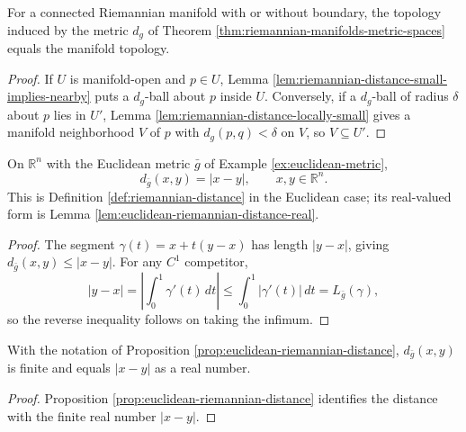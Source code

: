 \begin{theorem}
\label{thm:riemannian-distance-topology}





For a connected Riemannian manifold with or without boundary, the topology induced by the metric $d_g$ of Theorem \ref{thm:riemannian-manifolds-metric-spaces} equals the manifold topology.
\end{theorem}
\begin{proof}

\sketch If $U$ is manifold-open and $p\in U$, Lemma \ref{lem:riemannian-distance-small-implies-nearby} puts a $d_g$-ball about $p$ inside $U$. Conversely, if a $d_g$-ball of radius $\delta$ about $p$ lies in $U'$, Lemma \ref{lem:riemannian-distance-locally-small} gives a manifold neighborhood $V$ of $p$ with $d_g(p,q)<\delta$ on $V$, so $V\subseteq U'$.
\end{proof}

\begin{proposition}
\label{prop:euclidean-riemannian-distance}





On $\mathbb R^n$ with the Euclidean metric $\bar g$ of Example \ref{ex:euclidean-metric},
\[
d_{\bar g}(x,y)=|x-y|,
\qquad x,y\in\mathbb R^n.
\]
This is Definition \ref{def:riemannian-distance} in the Euclidean case; its real-valued form is Lemma \ref{lem:euclidean-riemannian-distance-real}.
\end{proposition}
\begin{proof}

\sketch The segment $\gamma(t)=x+t(y-x)$ has length $|y-x|$, giving $d_{\bar g}(x,y)\le|x-y|$. For any $C^1$ competitor,
\[
|y-x|=\left|\int_0^1\gamma'(t)\,dt\right|\le\int_0^1|\gamma'(t)|\,dt=L_{\bar g}(\gamma),
\]
so the reverse inequality follows on taking the infimum.
\end{proof}

\begin{lemma}
\label{lem:euclidean-riemannian-distance-real}





With the notation of Proposition \ref{prop:euclidean-riemannian-distance}, $d_{\bar g}(x,y)$ is finite and equals $|x-y|$ as a real number.
\end{lemma}
\begin{proof}

\sketch Proposition \ref{prop:euclidean-riemannian-distance} identifies the distance with the finite real number $|x-y|$.
\end{proof}

